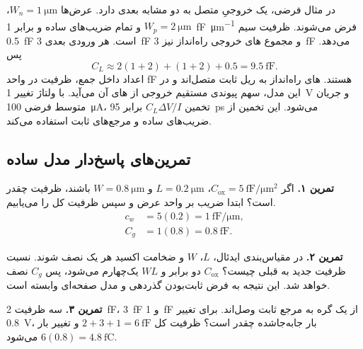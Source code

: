 در مثال فرضی، یک  خروجیِ متصل به دو  مشابه بعدی دارد.
عرض‌ها \(W_n=\qty{1}{\micro\metre}\)، \(W_p=\qty{2}{\micro\metre}\) و
تمام ضریب‌های ساده  و  برابر
\qty{1}{\femto\farad\per\micro\metre} فرض می‌شوند. ظرفیت سیم
\qty{0.5}{\femto\farad} است. هر ورودی بعدی \qty{3}{\femto\farad} و مجموع
های خروجی راه‌انداز نیز \qty{3}{\femto\farad} می‌دهد. پس
\begin{equation}
 C_L\approx2(1+2)+(1+2)+0.5=\qty{9.5}{\femto\farad}.
 \label{eq:cv-load-example}
\end{equation}
اعداد داخل جمع، ظرفیت در واحد \unit{\femto\farad} هستند.
های راه‌انداز به ریل ثابت متصل‌اند و در این مدل، سهم پیوندی مستقیم
خروجی از های آن می‌آید. با ولتاژ تغییر \qty{1}{\volt} و جریان متوسط
فرضی \qty{100}{\micro\ampere}، تخمین \(C_L\Delta V/I\) برابر
\qty{95}{\pico\second} می‌شود. این تخمین از ضریب‌های ساده و مرجع‌های ثابت استفاده می‌کند.

\subsection{تمرین‌های پاسخ‌دار مدل ساده}
\textbf{تمرین ۱.} اگر \(C_{\mathrm{ox}}=\qty{5}{\femto\farad\per\micro\metre\squared}\)،
\(L=\qty{0.2}{\micro\metre}\) و \(W=\qty{0.8}{\micro\metre}\) باشند،
ظرفیت چقدر است؟ ابتدا ضریب بر واحد عرض و سپس ظرفیت کل را می‌یابیم.
\[
 \begin{aligned}
 c_w&=5(0.2)=\qty{1}{\femto\farad\per\micro\metre},\\
 C_g&=1(0.8)=\qty{0.8}{\femto\farad}.
 \end{aligned}
\]

\textbf{تمرین ۲.} در مقیاس‌بندی ایدئال، \(L\)، \(W\) و ضخامت اکسید هر یک
نصف شوند. نسبت ظرفیت جدید به قبلی چیست؟ \(C_{\mathrm{ox}}\) دو برابر و
\(WL\) یک‌چهارم می‌شود، پس \(C_g\) نصف خواهد شد.
این نتیجه به فرض ثابت‌بودن گذردهی و مدل صفحه‌ای وابسته است.

\textbf{تمرین ۳.} سه ظرفیت \qty{2}{\femto\farad}، \qty{3}{\femto\farad} و
\qty{1}{\femto\farad} از یک گره به مرجع ثابت وصل‌اند. برای تغییر
\qty{0.8}{\volt}، بار جابه‌جاشده چقدر است؟ ظرفیت کل
\(2+3+1=\qty{6}{\femto\farad}\) و تغییر بار
\(6(0.8)=\qty{4.8}{\femto\coulomb}\) می‌شود.
\clearpage

